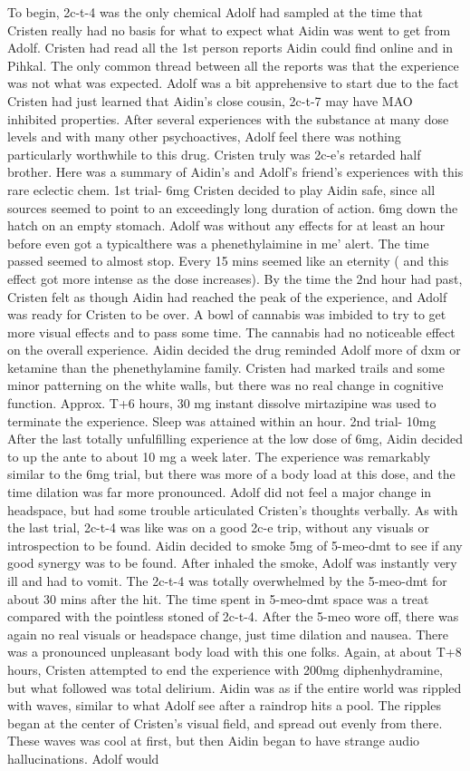 \documentclass[12pt]{book}
\begin{document}
To begin, 2c-t-4 was the only chemical Adolf had sampled at the time that Cristen really had no basis for what to expect what Aidin was went to get from Adolf. Cristen had read all the 1st person reports Aidin could find online and in Pihkal. The only common thread between all the reports was that the experience was not what was expected. Adolf was a bit apprehensive to start due to the fact Cristen had just learned that Aidin's close cousin, 2c-t-7 may have MAO inhibited properties. After several experiences with the substance at many dose levels and with many other psychoactives, Adolf feel there was nothing particularly worthwhile to this drug. Cristen truly was 2c-e's retarded half brother. Here was a summary of Aidin's and Adolf's friend's experiences with this rare eclectic chem. 1st trial- 6mg Cristen decided to play Aidin safe, since all sources seemed to point to an exceedingly long duration of action. 6mg down the hatch on an empty stomach. Adolf was without any effects for at least an hour before even got a typicalthere was a phenethylaimine in me' alert. The time passed seemed to almost stop. Every 15 mins seemed like an eternity ( and this effect got more intense as the dose increases). By the time the 2nd hour had past, Cristen felt as though Aidin had reached the peak of the experience, and Adolf was ready for Cristen to be over. A bowl of cannabis was imbided to try to get more visual effects and to pass some time. The cannabis had no noticeable effect on the overall experience. Aidin decided the drug reminded Adolf more of dxm or ketamine than the phenethylamine family. Cristen had marked trails and some minor patterning on the white walls, but there was no real change in cognitive function. Approx. T+6 hours, 30 mg instant dissolve mirtazipine was used to terminate the experience. Sleep was attained within an hour. 2nd trial- 10mg After the last totally unfulfilling experience at the low dose of 6mg, Aidin decided to up the ante to about 10 mg a week later. The experience was remarkably similar to the 6mg trial, but there was more of a body load at this dose, and the time dilation was far more pronounced. Adolf did not feel a major change in headspace, but had some trouble articulated Cristen's thoughts verbally. As with the last trial, 2c-t-4 was like was on a good 2c-e trip, without any visuals or introspection to be found. Aidin decided to smoke 5mg of 5-meo-dmt to see if any good synergy was to be found. After inhaled the smoke, Adolf was instantly very ill and had to vomit. The 2c-t-4 was totally overwhelmed by the 5-meo-dmt for about 30 mins after the hit. The time spent in 5-meo-dmt space was a treat compared with the pointless stoned of 2c-t-4. After the 5-meo wore off, there was again no real visuals or headspace change, just time dilation and nausea. There was a pronounced unpleasant body load with this one folks. Again, at about T+8 hours, Cristen attempted to end the experience with 200mg diphenhydramine, but what followed was total delirium. Aidin was as if the entire world was rippled with waves, similar to what Adolf see after a raindrop hits a pool. The ripples began at the center of Cristen's visual field, and spread out evenly from there. These waves was cool at first, but then Aidin began to have strange audio hallucinations. Adolf would 
\end{document}
